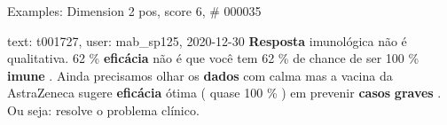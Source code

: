 \begin{frame}{Examples: Dimension 2 pos, score 6, \# 000035}
\footnotesize
\begin{exampleblock}{text: t001727, user: mab\_sp125, 2020-12-30}
\textbf{Resposta} imunológica não é qualitativa. 62 \% \textbf{eficácia} não é 
que você tem 62 \% de chance de ser 100 \% \textbf{imune} . Ainda precisamos 
olhar os \textbf{dados} com calma mas a vacina da AstraZeneca sugere 
\textbf{eficácia} ótima ( quase 100 \% ) em prevenir \textbf{casos} 
\textbf{graves} . Ou seja: resolve o problema clínico. 
\end{exampleblock}
\end{frame}
